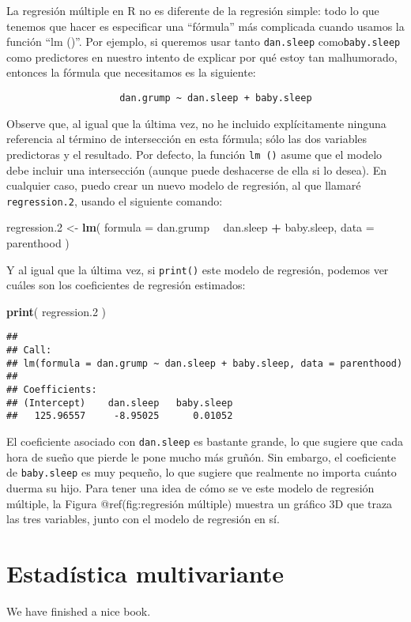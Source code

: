 \documentclass[
]{book}
\newenvironment{Shaded}{\begin{snugshade}}{\end{snugshade}}
\newcommand{\DataTypeTok}[1]{\textcolor[rgb]{0.13,0.29,0.53}{#1}}
\newcommand{\FloatTok}[1]{\textcolor[rgb]{0.00,0.00,0.81}{#1}}
\newcommand{\KeywordTok}[1]{\textcolor[rgb]{0.13,0.29,0.53}{\textbf{#1}}}
\newcommand{\NormalTok}[1]{#1}
\newcommand{\OperatorTok}[1]{\textcolor[rgb]{0.81,0.36,0.00}{\textbf{#1}}}
\newcommand{\StringTok}[1]{\textcolor[rgb]{0.31,0.60,0.02}{#1}}
\begin{document}
La regresión múltiple en R no es diferente de la regresión simple: todo lo que tenemos que hacer es especificar una ``fórmula'' más complicada cuando usamos la función ``lm ()''. Por ejemplo, si queremos usar tanto \texttt{dan.sleep} como\texttt{baby.sleep} como predictores en nuestro intento de explicar por qué estoy tan malhumorado, entonces la fórmula que necesitamos es la siguiente:

\begin{verbatim}
                    dan.grump ~ dan.sleep + baby.sleep
\end{verbatim}

Observe que, al igual que la última vez, no he incluido explícitamente ninguna referencia al término de intersección en esta fórmula; sólo las dos variables predictoras y el resultado. Por defecto, la función \texttt{lm\ ()} asume que el modelo debe incluir una intersección (aunque puede deshacerse de ella si lo desea). En cualquier caso, puedo crear un nuevo modelo de regresión, al que llamaré \texttt{regression.2}, usando el siguiente comando:

\begin{Shaded}
\begin{Highlighting}[]
\NormalTok{regression}\FloatTok{.2}\NormalTok{ <-}\StringTok{ }\KeywordTok{lm}\NormalTok{( }\DataTypeTok{formula =}\NormalTok{ dan.grump }\OperatorTok{~}\StringTok{ }\NormalTok{dan.sleep }\OperatorTok{+}\StringTok{ }\NormalTok{baby.sleep,  }
                     \DataTypeTok{data =}\NormalTok{ parenthood )}
\end{Highlighting}
\end{Shaded}

Y al igual que la última vez, si \texttt{print()} este modelo de regresión, podemos ver cuáles son los coeficientes de regresión estimados:

\begin{Shaded}
\begin{Highlighting}[]
\KeywordTok{print}\NormalTok{( regression}\FloatTok{.2}\NormalTok{ )}
\end{Highlighting}
\end{Shaded}

\begin{verbatim}
## 
## Call:
## lm(formula = dan.grump ~ dan.sleep + baby.sleep, data = parenthood)
## 
## Coefficients:
## (Intercept)    dan.sleep   baby.sleep  
##   125.96557     -8.95025      0.01052
\end{verbatim}

El coeficiente asociado con \texttt{dan.sleep} es bastante grande, lo que sugiere que cada hora de sueño que pierde le pone mucho más gruñón. Sin embargo, el coeficiente de \texttt{baby.sleep} es muy pequeño, lo que sugiere que realmente no importa cuánto duerma su hijo. Para tener una idea de cómo se ve este modelo de regresión múltiple, la Figura @ref(fig:regresión múltiple) muestra un gráfico 3D que traza las tres variables, junto con el modelo de regresión en sí.

\hypertarget{estaduxedstica-multivariante}{%
\chapter{Estadística multivariante}\label{estaduxedstica-multivariante}}

We have finished a nice book.

  
\end{document}
